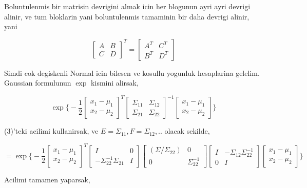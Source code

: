 \documentclass[12pt,fleqn]{article}\usepackage{../common}
\begin{document}
Boluntulenmis bir matrisin devrigini almak icin her blogunun ayri ayri devrigi
alinir, ve tum bloklarin yani boluntulenmis tamaminin bir daha devrigi
alinir, yani

\[ 
\left[\begin{array}{rr}
A & B \\ C & D 
\end{array}\right]^T = 
\left[\begin{array}{rr}
A^T & C^T \\ B^T & D^T
\end{array}\right]
 \]

Simdi cok degiskenli Normal icin bilesen ve kosullu yogunluk hesaplarina
gelelim. Gaussian formulunun $\exp$ kismini alirsak, 

\[ \exp 
\bigg\{ 
-\frac{ 1}{2}
\left[\begin{array}{r}
x_1 - \mu_1\\
x_2 - \mu_2
\end{array}\right]^T
\left[\begin{array}{rr}
\Sigma_{11} & \Sigma_{12}\\
\Sigma_{21} & \Sigma_{22}
\end{array}\right]^{-1}
\left[\begin{array}{r}
x_1 - \mu_1\\
x_2 - \mu_2
\end{array}\right]
\bigg\}
 \]


(3)'teki acilimi kullanirsak, ve $E = \Sigma_{11},F=\Sigma_{12},..$ olacak sekilde,

\[ = \exp 
\bigg\{ 
-\frac{ 1}{2}
\left[\begin{array}{r}
x_1 - \mu_1\\
x_2 - \mu_2
\end{array}\right]^T
\left[\begin{array}{rr}
I & 0 \\ 
-\Sigma_{22}^{-1}\Sigma_{21} & I
\end{array}\right]
\left[\begin{array}{rr}
(\Sigma/\Sigma_{22}) & 0 \\ 
0 & \Sigma_{22}^{-1} 
\end{array}\right]
\left[\begin{array}{rr}
I & -\Sigma_{12}\Sigma_{22}^{-1}  \\ 
0 & I
\end{array}\right]
\left[\begin{array}{r}
x_1 - \mu_1\\
x_2 - \mu_2
\end{array}\right]
\bigg\}
 \]


Acilimi tamamen yaparsak, 
\end{document}
